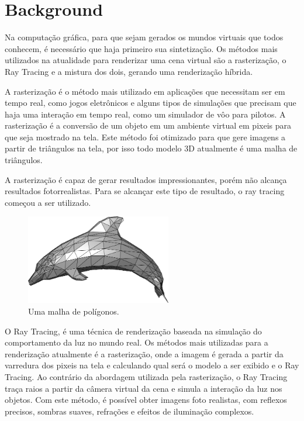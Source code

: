\documentclass[journal]{IEEEtran}
\begin{document}

\section{Background}

Na computação gráfica, para que sejam gerados os mundos virtuais que todos conhecem,
é necessário que haja primeiro sua sintetização. Os métodos mais utilizados na atualidade
para renderizar uma cena virtual são a rasterização, o Ray Tracing e a mistura dos dois,
gerando uma renderização híbrida.

A rasterização é o método mais utilizado em aplicações que necessitam ser em tempo
real, como jogos eletrônicos e alguns tipos de simulações que precisam que haja
uma interação em tempo real, como um simulador de vôo para pilotos. A rasterização
é a conversão de um objeto em um ambiente virtual em pixeis para que seja mostrado
na tela. Este método foi otimizado para que gere imagens a partir de triângulos na
tela, por isso todo modelo 3D atualmente é uma malha de triângulos.
\cite{c12}

A rasterização é capaz de gerar resultados impressionantes, porém não alcança 
resultados fotorrealistas. Para se alcançar este tipo de resultado, o ray tracing
começou a ser utilizado.

\begin{figure}[!t]
\centering
\includegraphics[width=2.5in]{media/mesh.png}
\caption{Uma malha de polígonos.}
\label{fig_sim}
\end{figure}

O Ray Tracing, é uma técnica de renderização baseada na simulação do comportamento
da luz no mundo real. Os métodos mais utilizadas para a renderização atualmente
é a rasterização, onde a imagem é gerada a partir da varredura dos pixeis na
tela e calculando qual será o modelo a ser exibido e o Ray Tracing. Ao contrário da
abordagem utilizada pela rasterização, o Ray Tracing traça raios a partir da
câmera virtual da cena e simula a interação da luz nos objetos. Com este método,
é possível obter imagens foto realistas, com reflexos precisos, sombras suaves,
refrações e efeitos de iluminação complexos. 
\end{document}
